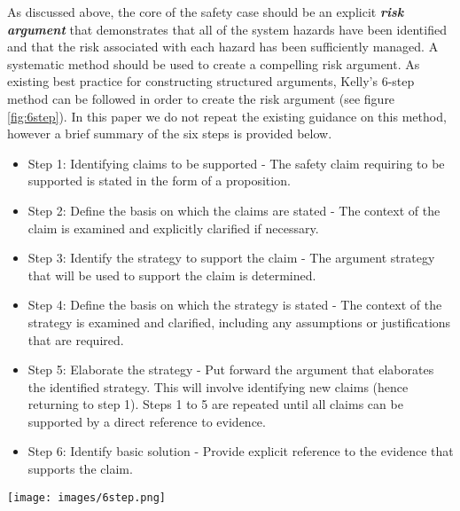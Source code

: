 As discussed above, the core of the safety case should be an explicit \textbf{\textit{risk argument}} that demonstrates that all of the system hazards have been identified and that the risk associated with each hazard has been sufficiently managed. A systematic method should be used to create a compelling risk argument. As existing best practice for constructing structured arguments, Kelly's 6-step method \cite{kelly1999arguing} can be followed in order to create the risk argument (see figure \ref{fig:6step}). In this paper we do not repeat the existing guidance on this method, however a brief summary of the six steps is provided below.

\begin{itemize}
    \item Step 1: Identifying claims to be supported - The safety claim requiring to be supported is stated in the form of a proposition.
    \item Step 2: Define the basis on which the claims are stated - The context of the claim is examined and explicitly clarified if necessary.
    \item Step 3: Identify the strategy to support the claim - The argument strategy that will be used to support the claim is determined.
    \item Step 4: Define the basis on which the strategy is stated - The context of the strategy is examined and clarified, including any assumptions or justifications that are required.
    \item Step 5: Elaborate the strategy - Put forward the argument that elaborates the identified strategy. This will involve identifying new claims (hence returning to step 1). Steps 1 to 5 are repeated until all claims can be supported by a direct reference to evidence.
    \item Step 6: Identify basic solution - Provide explicit reference to the evidence that supports the claim.
\end{itemize}

\begin{figure*}
\centering
\texttt{[image: images/6step.png]}
\caption{Kelly's 6-step method \cite{kelly1999arguing}}
\label{fig:6step}
\end{figure*}


